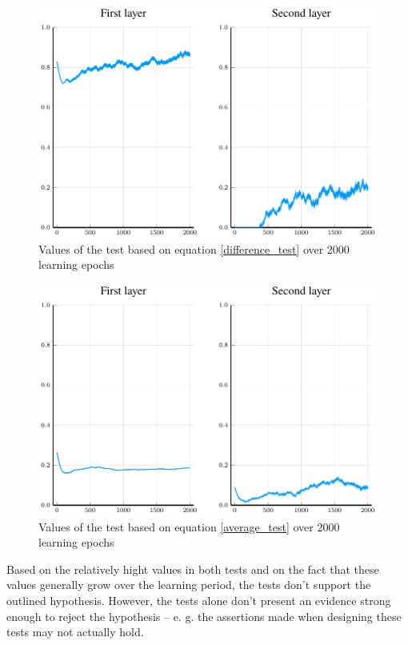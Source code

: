 \begin{figure}
	\centering
	\includegraphics[width=\textwidth]{images/relu-difference-test/difference.pdf}
	\caption{Values of the test based on equation \ref{difference_test} over 2000 learning epochs}\label{difference_test_results}
\end{figure}

\begin{figure}
	\centering
	\includegraphics[width=\textwidth]{images/relu-average-test/average.pdf}
	\caption{Values of the test based on equation \ref{average_test} over 2000 learning epochs}\label{average_test_results}
\end{figure}

Based on the relatively hight values in both tests and on the fact that these values generally grow over the learning period, the tests don't support the outlined hypothesis. However, the tests alone don't present an evidence strong enough to reject the hypothesis -- e. g. the assertions made when designing these tests may not actually hold. 

